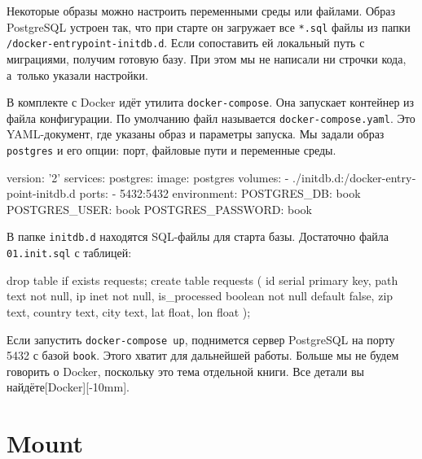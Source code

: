Некоторые образы можно настроить переменными среды или файлами. Образ PostgreSQL
устроен так, что при старте он загружает все \verb|*.sql| файлы из папки
\verb|/docker-entrypoint-initdb.d|. Если сопоставить ей локальный путь с
миграциями, получим готовую базу. При этом мы не написали ни строчки кода,
а~только указали настройки.



В комплекте с Docker идёт утилита \verb|docker-compose|. Она запускает
контейнер из файла конфигурации. По умолчанию файл называется
\verb|docker-compose.yaml|. Это YAML-документ, где указаны образ и параметры
запуска. Мы задали образ \verb|postgres| и его опции: порт, файловые пути и
переменные среды.


\begin{english}
  \begin{yaml}
version: '2'
services:
  postgres:
    image: postgres
    volumes:
      - ./initdb.d:/docker-entrypoint-initdb.d
    ports:
      - 5432:5432
    environment:
      POSTGRES_DB: book
      POSTGRES_USER: book
      POSTGRES_PASSWORD: book
  \end{yaml}
\end{english}

В папке \verb|initdb.d| находятся SQL-файлы для старта базы. Достаточно файла
\verb|01.init.sql| с таблицей:


\begin{english}
  \begin{sql}
drop table if exists requests;
create table requests (
    id            serial primary key,
    path          text not null,
    ip            inet not null,
    is_processed  boolean not null default false,
    zip           text,
    country       text,
    city          text,
    lat           float,
    lon           float
);
  \end{sql}
\end{english}

Если запустить \verb|docker-compose up|, поднимется сервер PostgreSQL на порту
5432 с базой \verb|book|. Этого хватит для дальнейшей работы. Больше мы не
будем говорить о Docker, поскольку это тема отдельной книги. Все детали вы
найдёте[Docker][-10mm].

\section{Mount}

